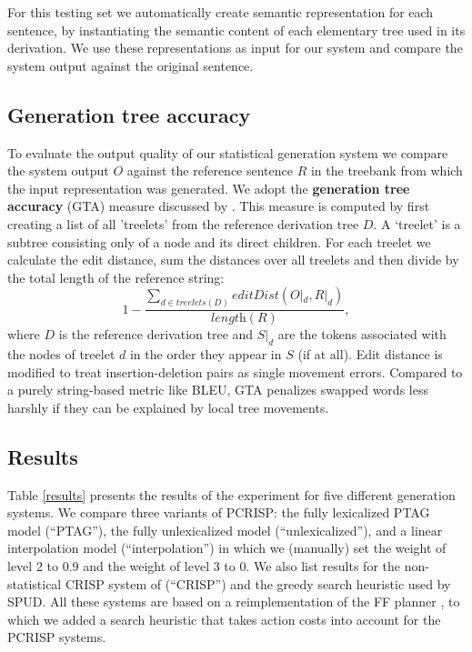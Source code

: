 For this testing set we automatically create semantic representation for each sentence, by instantiating the semantic content of each elementary tree used in its derivation. We use these representations as input for our system and compare the system output against the original sentence.


\subsection{Generation tree accuracy}
\label{ssec:eval-measures}
To evaluate the output quality of our statistical generation system we compare the system output $O$ against the reference sentence $R$ in the treebank from which the input representation was generated. We adopt the {\bf generation tree accuracy} (GTA) measure discussed by \cite{bangalorerambowwhittaker2001}.
This measure is computed by first creating a list of all 'treelets' from the reference derivation tree $D$. A `treelet' is a subtree consisting only of a node and its direct children. For each treelet we calculate the edit distance, sum the distances over all treelets and then divide by the total length of the reference string:
$$1 - \frac{\sum\limits_{d \in treelets(D)} editDist(O|_d, R|_d)}{\textit{length}(R)},$$
where $D$ is the reference derivation tree and $S|_d$ are the tokens associated with the nodes of treelet $d$ in the order they appear in $S$ (if at all).  Edit distance is modified to treat insertion-deletion pairs as single movement errors.  Compared to a purely string-based metric like BLEU, GTA penalizes swapped words less harshly if they can be explained by local tree movements.


\subsection{Results}

Table \ref{results} presents the results of the experiment for five different generation systems.  We compare three variants of PCRISP: the fully lexicalized PTAG model (``PTAG''), the fully unlexicalized model (``unlexicalized''), and a linear interpolation model (``interpolation'') in which we (manually) set the weight of level 2 to 0.9 and the weight of level 3 to 0.  We also list results for the non-statistical CRISP system of   (``CRISP'') and the greedy search heuristic used by SPUD.  All these systems are based on a reimplementation of the FF planner \cite{hoffmannnebel2001}, to which we added a search heuristic that takes action costs into account for the PCRISP systems.

